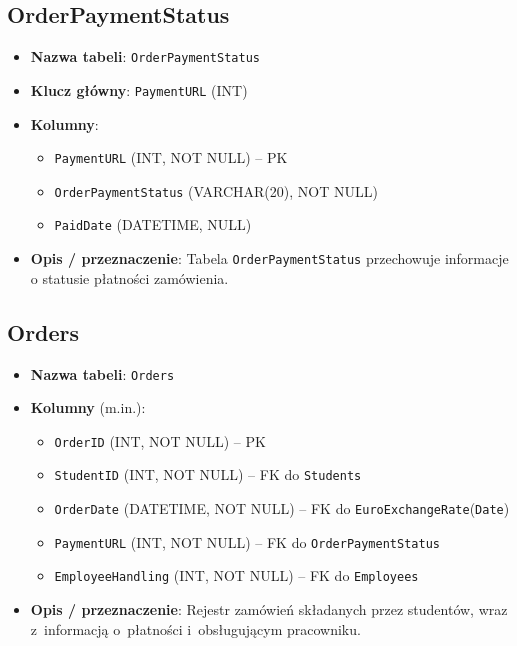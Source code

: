 \documentclass[12pt]{article}
\begin{document}
\subsection{OrderPaymentStatus}
\begin{itemize}
    \item \textbf{Nazwa tabeli}: \texttt{OrderPaymentStatus}
    \item \textbf{Klucz główny}: \texttt{PaymentURL} (INT)
    \item \textbf{Kolumny}:
          \begin{itemize}
            \item \texttt{PaymentURL} (INT, NOT NULL) -- PK
            \item \texttt{OrderPaymentStatus} (VARCHAR(20), NOT NULL)
            \item \texttt{PaidDate} (DATETIME, NULL)
          \end{itemize}
    \item \textbf{Opis / przeznaczenie}:  
          Tabela \texttt{OrderPaymentStatus} przechowuje informacje o statusie płatności zamówienia.
\end{itemize}

\subsection{Orders}
\begin{itemize}
    \item \textbf{Nazwa tabeli}: \texttt{Orders}
    \item \textbf{Kolumny} (m.in.):
          \begin{itemize}
            \item \texttt{OrderID} (INT, NOT NULL) -- PK
            \item \texttt{StudentID} (INT, NOT NULL) -- FK do \texttt{Students}
            \item \texttt{OrderDate} (DATETIME, NOT NULL) -- FK do \texttt{EuroExchangeRate}(\texttt{Date})
            \item \texttt{PaymentURL} (INT, NOT NULL) -- FK do \texttt{OrderPaymentStatus}
            \item \texttt{EmployeeHandling} (INT, NOT NULL) -- FK do \texttt{Employees}
          \end{itemize}
    \item \textbf{Opis / przeznaczenie}:  
          Rejestr zamówień składanych przez studentów, wraz z~informacją o~płatności i~obsługującym pracowniku.
\end{itemize}
\end{document}
